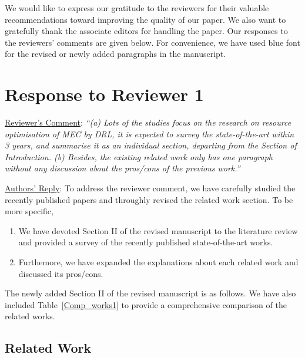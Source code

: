 \documentclass[12pt,draftclsnofoot,onecolumn]{IEEEtran}
\newcommand{\rev}[1]{{\color{blue}#1}} %
\newcommand{\rev}[1]{#1}
\newenvironment{my}[2]%
{\begin{list}{}%
{\setlength{\rightmargin}{#1}\setlength{\leftmargin}{#2}}%


 \item[]{}

} {\end{list}}
\begin{document}
\noindent We would like to express our gratitude to the reviewers for their valuable recommendations toward improving the quality of our paper. We also want to gratefully thank the associate editors for handling the paper. Our responses to the reviewers' comments are given below. For convenience, we have used blue font for the revised or newly added paragraphs in the manuscript.\newline

\setcounter{section}{0}
\renewcommand*{\thesection}{\Roman{section}}
\makeatletter
\setcounter{table}{0}

\section{Response to Reviewer 1}
\begin{enumerate}
\label{section:300}
\item \underline{Reviewer's Comment}: 
\textit{``(a) Lots of the studies focus on the research on resource optimisation of MEC by DRL, it is expected to survey the state-of-the-art within 3 years, and summarise it as an individual section, departing from the Section of Introduction. (b) Besides, the existing related work only has one paragraph without any discussion about the pros/cons of the previous work.''} \newline

\underline{Authors' Reply}: To address the reviewer comment, we have carefully studied the recently published papers and throughly revised the related work section. To be more specific,
\begin{enumerate}[]
\item We have devoted Section II of the revised manuscript to the literature review and provided a survey of the recently published state-of-the-art works.
\item Furthemore, we have expanded the explanations about each related work and discussed its pros/cons.
\end{enumerate}\vspace{6mm}
The newly added Section II of the revised manuscript is as follows. We have also included Table~\ref{Comp_works1} to provide a comprehensive comparison of the related works. 
\begin{my}{1cm}{1cm}
	\rev{\setcounter{section}{1}
		\section{Related Work}
		\label{section:RW1}

}
\end{my}
\end{enumerate}
\end{document}
